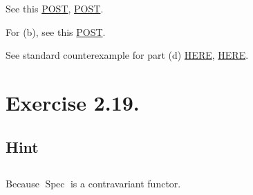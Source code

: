 See this \href{https://math.stackexchange.com/questions/1442665/a-noetherian-topological-space-is-compact}{POST}, \href{https://math.stackexchange.com/questions/2745543/v-is-noetherian-space-if-only-if-every-open-subset-of-v-is-compact}{POST}.

For (b), see this \href{https://math.stackexchange.com/questions/4690764/is-this-space-noetherian}{POST}.

See standard counterexample for part (d) \href{https://math.stackexchange.com/questions/1611732/example-of-non-noetherian-ring-whose-spectrum-is-noetherian/1611757#1611757}{HERE}, \href{https://math.stackexchange.com/questions/7392/a-non-noetherian-ring-with-noetherian-spectrum}{HERE}.


\section{Exercise 2.19.}

\subsection{Hint}



\subsection{}

Because $\operatorname{Spec}$ is a contravariant functor.